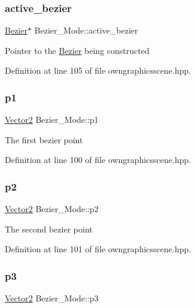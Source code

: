 \subsubsection{\texorpdfstring{active\+\_\+bezier}{active\_bezier}}
{\footnotesize\ttfamily \mbox{\hyperlink{classBezier}{Bezier}}$\ast$ Bezier\+\_\+\+Mode\+::active\+\_\+bezier}

Pointer to the \mbox{\hyperlink{classBezier}{Bezier}} being constructed 

Definition at line 105 of file owngraphicsscene.\+hpp.

\mbox{\label{structBezier__Mode_a2d7c5ccccb03114fd1b26a20843a59e4}} 
\subsubsection{\texorpdfstring{p1}{p1}}
{\footnotesize\ttfamily \mbox{\hyperlink{classVector2}{Vector2}} Bezier\+\_\+\+Mode\+::p1}

The first bezier point 

Definition at line 100 of file owngraphicsscene.\+hpp.

\mbox{\label{structBezier__Mode_a96ed0f4076e540e5a8789f25f9bf65e9}} 
\subsubsection{\texorpdfstring{p2}{p2}}
{\footnotesize\ttfamily \mbox{\hyperlink{classVector2}{Vector2}} Bezier\+\_\+\+Mode\+::p2}

The second bezier point 

Definition at line 101 of file owngraphicsscene.\+hpp.

\mbox{\label{structBezier__Mode_ad9fbff84a5248923ceb29433dc58f49b}} 
\subsubsection{\texorpdfstring{p3}{p3}}
{\footnotesize\ttfamily \mbox{\hyperlink{classVector2}{Vector2}} Bezier\+\_\+\+Mode\+::p3}

